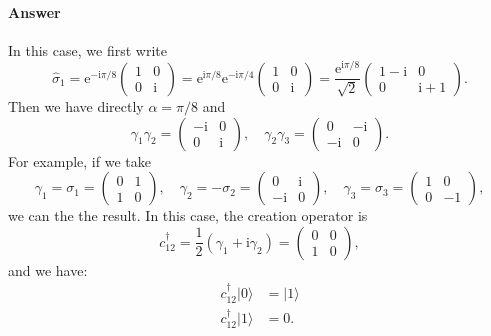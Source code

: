 \paragraph{Answer}
In this case, we first write
\begin{equation*}
\hat{\sigma }_{1} =\mathrm{e}^{-\mathrm{i} \pi /8}\begin{pmatrix}
1 & 0\\
0 & \mathrm{i}
\end{pmatrix} =\mathrm{e}^{\mathrm{i} \pi /8}\mathrm{e}^{-\mathrm{i} \pi /4}\begin{pmatrix}
1 & 0\\
0 & \mathrm{i}
\end{pmatrix} =\frac{\mathrm{e}^{\mathrm{i} \pi /8}}{\sqrt{2}}\begin{pmatrix}
1-\mathrm{i} & 0\\
0 & \mathrm{i} +1
\end{pmatrix} .
\end{equation*}
Then we have directly $\alpha =\pi /8$ and
\begin{equation*}
\gamma _{1} \gamma _{2} =\begin{pmatrix}
-\mathrm{i} & 0\\
0 & \mathrm{i}
\end{pmatrix} ,\quad \gamma _{2} \gamma _{3} =\begin{pmatrix}
0 & -\mathrm{i}\\
-\mathrm{i} & 0
\end{pmatrix} .
\end{equation*}
For example, if we take
\begin{equation*}
\gamma _{1} =\sigma _{1} =\begin{pmatrix}
0 & 1\\
1 & 0
\end{pmatrix} ,\quad \gamma _{2} =-\sigma _{2} =\begin{pmatrix}
0 & \mathrm{i}\\
-\mathrm{i} & 0
\end{pmatrix} ,\quad \gamma _{3} =\sigma _{3} =\begin{pmatrix}
1 & 0\\
0 & -1
\end{pmatrix} ,
\end{equation*}
we can the the result. In this case, the creation operator is
\begin{equation*}
c_{12}^{\dagger } =\frac{1}{2}( \gamma _{1} +\mathrm{i} \gamma _{2}) =\begin{pmatrix}
0 & 0\\
1 & 0
\end{pmatrix} ,
\end{equation*}
and we have:
\begin{equation*}
\begin{aligned}
c_{12}^{\dagger } |0 \rangle  & =|1 \rangle \\
c_{12}^{\dagger } |1 \rangle  & =0.
\end{aligned}
\end{equation*}

